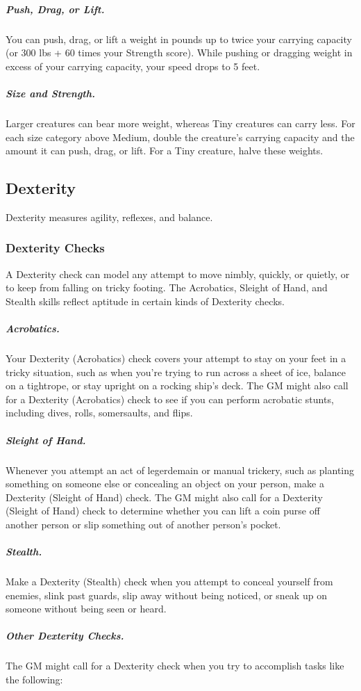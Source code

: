 \subparagraph*{Push, Drag, or Lift.} You can push, drag, or lift a weight in pounds up to twice your carrying capacity (or 300 lbs + 60 times your Strength score). While pushing or dragging weight in excess of your carrying capacity, your speed drops to 5 feet.

\subparagraph*{Size and Strength.} Larger creatures can bear more weight, whereas Tiny creatures can carry less. For each size category above Medium, double the creature's carrying capacity and the amount it can push, drag, or lift. For a Tiny creature, halve these weights.

\subsection{Dexterity}

Dexterity measures agility, reflexes, and balance.

\subsubsection{Dexterity Checks}

A Dexterity check can model any attempt to move nimbly, quickly, or quietly, or to keep from falling on tricky footing. The Acrobatics, Sleight of Hand, and Stealth skills reflect aptitude in certain kinds of Dexterity checks.

\subparagraph*{Acrobatics.} Your Dexterity (Acrobatics) check covers your attempt to stay on your feet in a tricky situation, such as when you're trying to run across a sheet of ice, balance on a tightrope, or stay upright on a rocking ship's deck. The GM might also call for a Dexterity (Acrobatics) check to see if you can perform acrobatic stunts, including dives, rolls, somersaults, and flips.

\subparagraph*{Sleight of Hand.} Whenever you attempt an act of legerdemain or manual trickery, such as planting something on someone else or concealing an object on your person, make a Dexterity (Sleight of Hand) check. The GM might also call for a Dexterity (Sleight of Hand) check to determine whether you can lift a coin purse off another person or slip something out of another person's pocket.

\subparagraph*{Stealth.} Make a Dexterity (Stealth) check when you attempt to conceal yourself from enemies, slink past guards, slip away without being noticed, or sneak up on someone without being seen or heard.

\subparagraph*{Other Dexterity Checks.} The GM might call for a Dexterity check when you try to accomplish tasks like the following:

